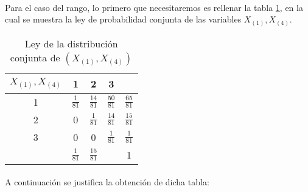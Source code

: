 \documentclass{article}
\begin{document}
      \paragraph{}
      Para el caso del rango, lo primero que necesitaremos es rellenar la tabla \ref{table:joint_1_4}, en la cual se muestra la ley de probabilidad conjunta de las variables $X_{(1)},X_{(4)}$.

      \begin{table}[H]
        \centering
        \begin{tabular}{c | c  c  c | c}
          $X_{(1)},X_{(4)}$ & 1               & 2               & 3               &                 \\ \hline
          1                 & $\frac{1}{81}$  & $\frac{14}{81}$ & $\frac{50}{81}$ & $\frac{65}{81}$ \\
          2                 & 0               & $\frac{1}{81}$  & $\frac{14}{81}$ & $\frac{15}{81}$ \\
          3                 & 0               & 0               & $\frac{1}{81}$  & $\frac{1}{81}$  \\ \hline
                            &  $\frac{1}{81}$ & $\frac{15}{81}$ &                 & 1
        \end{tabular}
        \caption{Ley de la distribución conjunta de $(X_{(1)},X_{(4)})$}
        \label{table:joint_1_4}
      \end{table}

      \paragraph{}
      A continuación se justifica la obtención de dicha tabla:
\end{document}
